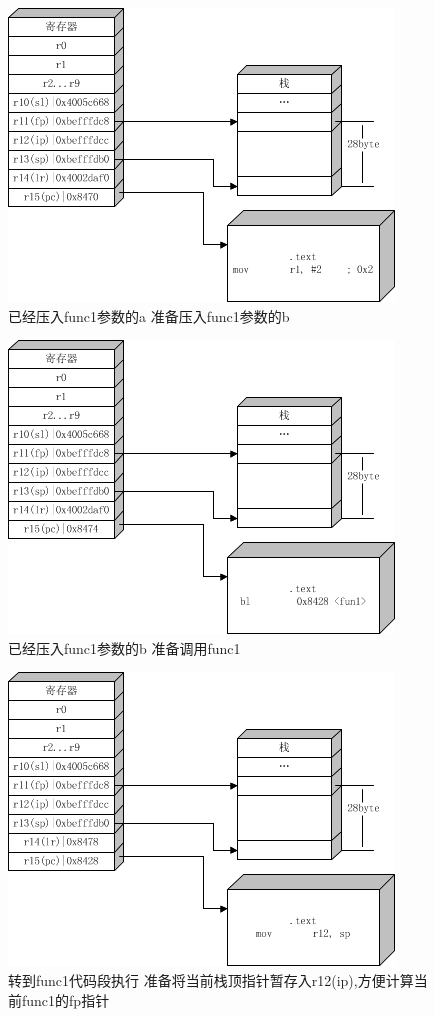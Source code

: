 \begin{figure}[htbp]%
\centering
\includegraphics[bb=0 0 387 294,scale=0.7]{armapcs1_2.png}
\caption{已经压入func1参数的a 准备压入func1参数的b}
\label{fig:anna}
\end{figure}

\begin{figure}[htbp]%
\centering
\includegraphics[bb=0 0 387 294,scale=0.7]{armapcs1_3.png}
\caption{已经压入func1参数的b 准备调用func1}
\label{fig:anna}
\end{figure}

\begin{figure}[htbp]%
\centering
\includegraphics[bb=0 0 387 294,scale=0.7]{armapcs1_4.png}
\caption{转到func1代码段执行 准备将当前栈顶指针暂存入r12(ip),方便计算当前func1的fp指针}
\label{fig:anna}
\end{figure}

